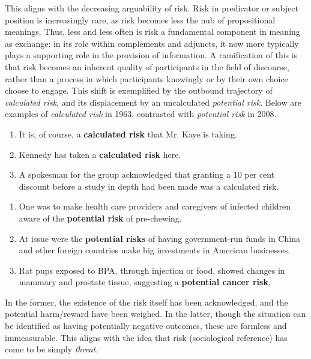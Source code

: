 
        This aligns with the decreasing arguability of risk. Risk in predicator or subject position is increasingly rare, as risk becomes less the nub of propositional meanings. Thus, less and less often is risk a fundamental component in meaning as exchange: in its role within complements and adjuncts, it now more typically plays a supporting role in the provision of information. A ramification of this is that risk becomes an inherent quality of participants in the field of discourse, rather than a process in which participants knowingly or by their own choice choose to engage. This shift is exemplified by the outbound trajectory of \emph{calculated risk}, and its displacement by an uncalculated \emph{potential risk}. Below are examples of \emph{calculated risk} in 1963, contrasted with \emph{potential risk} in 2008.

        \begin{enumerate}   [before=\itshape,font=\normalfont] \setlength\itemsep{0em} \small
            \item It is, of course, a \textbf{calculated risk} that Mr. Kaye is taking.
            \item Kennedy has taken a \textbf{calculated risk} here.
            \item A spokesman for the group acknowledged that granting a 10 per cent discount before a study in depth had been made was a calculated risk.
        \end{enumerate}

        \begin{enumerate}   [before=\itshape,font=\normalfont] \setlength\itemsep{0em} \small
            \item One was to make health care providers and caregivers of infected children aware of the \textbf{potential risk} of pre-chewing.
            \item At issue were the \textbf{potential risks} of having government-run funds in China and other foreign countries make big investments in American businesses.
            \item Rat pups exposed to BPA, through injection or food, showed changes in mammary and prostate tissue, suggesting a \textbf{potential cancer risk}.
        \end{enumerate}

        In the former, the existence of the risk itself has been acknowledged, and the potential harm\slash reward have been weighed. In the latter, though the situation can be identified as having potentially negative outcomes, these are formless and immeasurable. This aligns with the idea that risk (sociological reference) has come to be simply \emph{threat}.

